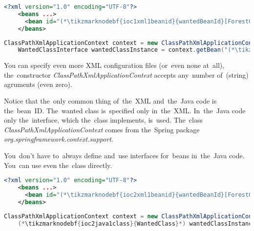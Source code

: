 \example
\begin{lstlisting}[language=XML, title={Configuration XML}]
    <?xml version="1.0" encoding="UTF-8"?>
    <beans ...>
      <bean id="(*\tikzmarknodebf{ioc1xml1beanid}{wantedBeanId}[ForestGreen]*)" class="package.subfolder.WantedClass"/>
    </beans>
\end{lstlisting}
\begin{lstlisting}[language=Java, title={Usage}]
    ClassPathXmlApplicationContext context = new ClassPathXmlApplicationContext("configurationFile.xml");
    WantedClassInterface wantedClassInstance = context.getBean("(*\tikzmarknodebf{ioc1java1beanid}{wantedBeanId}[ForestGreen]*)", WantedClassInterface.class);
\end{lstlisting}

\noindent You can specify even more XML configuration files (or~even none at~all), the~constructor \textit{ClassPathXmlApplicationContext} accepts any~number of~(string) agruments (even zero).

Notice that the~only common thing of~the~XML and~the~Java code is the~bean~ID. The~wanted class is~specified only in~the~XML. In~the~Java code only the~interface, which the~class implements, is~used. The~class \textit{ClassPathXmlApplicationContext} comes from the~Spring package \textit{org.springframework.context.support}.

\note You~don't have to~always define and~use interfaces for~beans in~the~Java code. You~can use even the~class directly.
\begin{lstlisting}[language=XML, title={Configuration XML}]
    <?xml version="1.0" encoding="UTF-8"?>
    <beans ...>
      <bean id="(*\tikzmarknodebf{ioc2xml1beanid}{wantedBeanId}[ForestGreen]*)" class="package.subfolder.(*\tikzmarknodebf{ioc2xml1class}{WantedClass}[ForestGreen]*)"/>
    </beans>
\end{lstlisting}
\begin{lstlisting}[language=Java, title={Usage}]
    ClassPathXmlApplicationContext context = new ClassPathXmlApplicationContext("configurationFile.xml");
    (*\tikzmarknodebf{ioc2java1class}{WantedClass}*) wantedClassInstance = context.getBean("(*\tikzmarknodebf{ioc2java1beanid}{wantedBeanId}[ForestGreen]*)", (*\tikzmarknodebf{ioc2java1class2}{WantedClass}*).class);
\end{lstlisting}

